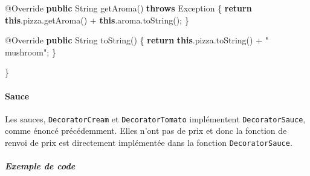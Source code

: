 \documentclass[french,]{article}
\newenvironment{Shaded}{}{}
\newcommand{\KeywordTok}[1]{\textcolor[rgb]{0.00,0.44,0.13}{\textbf{{#1}}}}
\newcommand{\StringTok}[1]{\textcolor[rgb]{0.25,0.44,0.63}{{#1}}}
\newcommand{\FunctionTok}[1]{\textcolor[rgb]{0.02,0.16,0.49}{{#1}}}
\newcommand{\NormalTok}[1]{{#1}}
\let\oldparagraph\paragraph
\renewcommand{\paragraph}[1]{\oldparagraph{#1}\mbox{}}
\let\oldsubparagraph\subparagraph
\renewcommand{\subparagraph}[1]{\oldsubparagraph{#1}\mbox{}}
\begin{document}
\begin{Shaded}
\begin{Highlighting}[]
\FunctionTok{@Override}
\KeywordTok{public} \NormalTok{String }\FunctionTok{getAroma}\NormalTok{() }\KeywordTok{throws} \NormalTok{Exception \{}
  \KeywordTok{return} \KeywordTok{this}\NormalTok{.}\FunctionTok{pizza}\NormalTok{.}\FunctionTok{getAroma}\NormalTok{() + }\KeywordTok{this}\NormalTok{.}\FunctionTok{aroma}\NormalTok{.}\FunctionTok{toString}\NormalTok{();}
\NormalTok{\}}

\FunctionTok{@Override}
\KeywordTok{public} \NormalTok{String }\FunctionTok{toString}\NormalTok{() \{}
  \KeywordTok{return} \KeywordTok{this}\NormalTok{.}\FunctionTok{pizza}\NormalTok{.}\FunctionTok{toString}\NormalTok{() + }\StringTok{" mushroom"}\NormalTok{;}
\NormalTok{\}}


\NormalTok{\}}
\end{Highlighting}
\end{Shaded}

\paragraph{Sauce}\label{sauce}

Les sauces, \texttt{DecoratorCream} et \texttt{DecoratorTomato}
implémentent \texttt{DecoratorSauce}, comme énoncé précédemment. Elles
n'ont pas de prix et donc la fonction de renvoi de prix est directement
implémentée dans la fonction \texttt{DecoratorSauce}.

\subparagraph{Exemple de code}\label{exemple-de-code-1}
\end{document}
